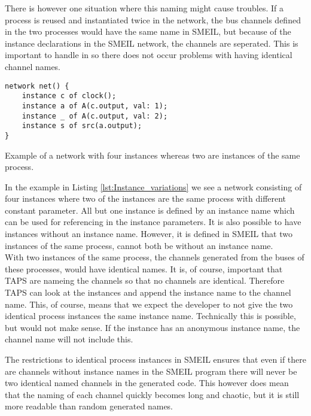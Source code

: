 There is however one situation where this naming might cause troubles. If a process is reused and instantiated twice in the network, the bus channels defined in the two processes would have the same name in SMEIL, but because of the instance declarations in the SMEIL network, the channels are seperated. This is important to handle in \cspm{} so there does not occur problems with having identical channel names.

\begin{listing}
\begin{verbatim}
network net() {
    instance c of clock();
    instance a of A(c.output, val: 1);
    instance _ of A(c.output, val: 2);
    instance s of src(a.output);
}
\end{verbatim}
\caption{Example of a network with four instances whereas two are instances of the same process.}
\label{lst:Instance_variations}
\end{listing}
In the example in Listing \ref{lst:Instance_variations} we see a network consisting of four instances where two of the instances are the same process with different constant parameter.
All but one instance is defined by an instance name which can be used for referencing in the instance parameters. It is also possible to have instances without an instance name. However, it is defined in SMEIL that two instances of the same process, cannot both be without an instance name.\\

With two instances of the same process, the \cspm{} channels generated from the buses of these processes, would have identical names. It is, of course, important that TAPS are nameing the channels so that no \cspm{} channels are identical. Therefore TAPS can look at the instances and append the instance name to the \cspm{} channel name. This, of course, means that we expect the developer to not give the two identical process instances the same instance name. Technically this is possible, but would not make sense.
If the instance has an anonymous instance name, the \cspm{} channel name will not include this.

The restrictions to identical process instances in SMEIL ensures that even if there are channels without instance names in the SMEIL program there will never be two identical named \cspm{} channels in the generated code. This however does mean that the naming of each channel quickly becomes long and chaotic, but it is still more readable than random generated names.

